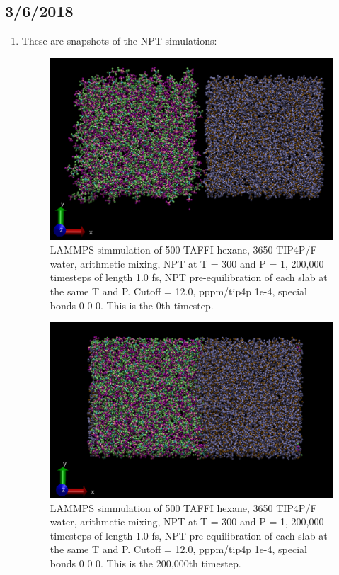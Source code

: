 \documentclass[12pt,reqno]{amsart}
\numberwithin{equation}{section}
\begin{document}
\subsection{3/6/2018}
\begin{enumerate}
\item These are snapshots of the NPT simulations:

\begin{figure}[H]
\centering
\includegraphics[scale=0.4]{lammps_taffi-tip4pF_0}
\caption{LAMMPS simmulation of 500 TAFFI hexane, 3650 TIP4P/F water, arithmetic mixing, NPT at T = 300 and P = 1, 200,000 timesteps of length 1.0 fs, NPT pre-equilibration of each slab at the same T and P.  Cutoff = 12.0, pppm/tip4p 1e-4, special bonds 0 0 0.  This is the 0th timestep.}
\end{figure}

\begin{figure}[H]
\centering
\includegraphics[scale=0.4]{lammps_taffi-tip4pF_200000}
\caption{LAMMPS simmulation of 500 TAFFI hexane, 3650 TIP4P/F water, arithmetic mixing, NPT at T = 300 and P = 1, 200,000 timesteps of length 1.0 fs, NPT pre-equilibration of each slab at the same T and P.  Cutoff = 12.0, pppm/tip4p 1e-4, special bonds 0 0 0.  This is the 200,000th timestep.}
\end{figure}


\end{enumerate}
\end{document}
